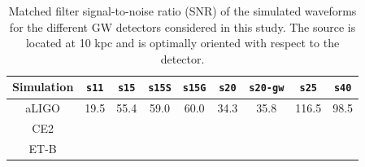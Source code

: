 \begin{table}
  \centering
  \begin{tabular}{c|cccccccc}
    \hline
    
    Simulation & \texttt{s11} & \texttt{s15} & \texttt{s15S} & \texttt{s15G} & \texttt{s20} & \texttt{s20-gw} & \texttt{s25}  & \texttt{s40}
    \\   
    \hline
    aLIGO      & 19.5         & 55.4         & 59.0          &   60.0        & 34.3         &   35.8          & 116.5         & 98.5
    \\ 
    \hline
    CE2
    \\
    \hline
    ET-B
    \\ 
  \end{tabular}
  \caption{%
    Matched filter signal-to-noise ratio (SNR) of the simulated waveforms for
    the different GW detectors considered in this study. The source is located
    at 10 kpc and is optimally oriented with respect to the detector.
  }
  \label{Tab:SNR}
\end{table}
